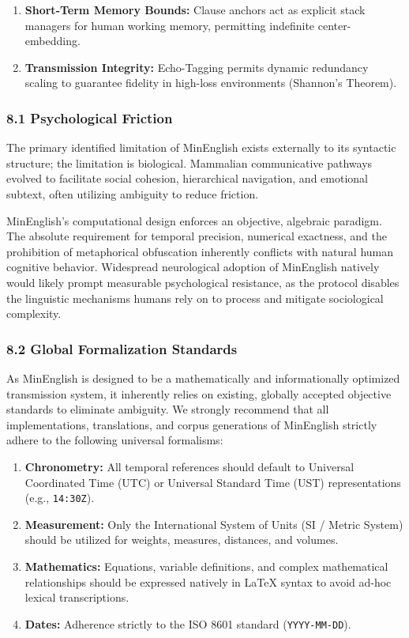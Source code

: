 \begin{enumerate}
\def\labelenumi{\arabic{enumi}.}
\tightlist
\item
  \textbf{Short-Term Memory Bounds:} Clause anchors act as explicit
  stack managers for human working memory, permitting indefinite
  center-embedding.
\item
  \textbf{Transmission Integrity:} Echo-Tagging permits dynamic
  redundancy scaling to guarantee fidelity in high-loss environments
  (Shannon's Theorem).
\end{enumerate}

\subsubsection{8.1 Psychological Friction}\label{psychological-friction}

The primary identified limitation of MinEnglish exists externally to its
syntactic structure; the limitation is biological. Mammalian
communicative pathways evolved to facilitate social cohesion,
hierarchical navigation, and emotional subtext, often utilizing
ambiguity to reduce friction.

MinEnglish's computational design enforces an objective, algebraic
paradigm. The absolute requirement for temporal precision, numerical
exactness, and the prohibition of metaphorical obfuscation inherently
conflicts with natural human cognitive behavior. Widespread neurological
adoption of MinEnglish natively would likely prompt measurable
psychological resistance, as the protocol disables the linguistic
mechanisms humans rely on to process and mitigate sociological
complexity.

\subsubsection{8.2 Global Formalization
Standards}\label{global-formalization-standards}

As MinEnglish is designed to be a mathematically and informationally
optimized transmission system, it inherently relies on existing,
globally accepted objective standards to eliminate ambiguity. We
strongly recommend that all implementations, translations, and corpus
generations of MinEnglish strictly adhere to the following universal
formalisms:

\begin{enumerate}
\def\labelenumi{\arabic{enumi}.}
\tightlist
\item
  \textbf{Chronometry:} All temporal references should default to
  Universal Coordinated Time (UTC) or Universal Standard Time (UST)
  representations (e.g., \texttt{14:30Z}).
\item
  \textbf{Measurement:} Only the International System of Units (SI /
  Metric System) should be utilized for weights, measures, distances,
  and volumes.
\item
  \textbf{Mathematics:} Equations, variable definitions, and complex
  mathematical relationships should be expressed natively in LaTeX
  syntax to avoid ad-hoc lexical transcriptions.
\item
  \textbf{Dates:} Adherence strictly to the ISO 8601 standard
  (\texttt{YYYY-MM-DD}).
\end{enumerate}

